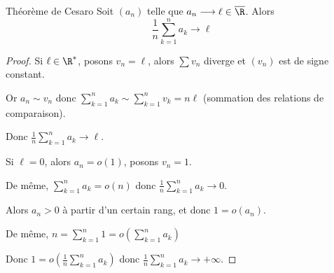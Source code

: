 \begin{proposition}{Théorème de Cesaro}{}
    Soit $(a_n)$ telle que $a_n \longrightarrow \ell \in \overline \R$. Alors 
    $$\frac 1 n \sum_{k = 1}^{n } a_k \longrightarrow \ell$$
    
\end{proposition}


\begin{proof}
    Si $\ell \in \R^*$, posons $v_n = \ell$, alors $\sum v_n$ diverge et $(v_n)$ est de signe constant.

    Or $\displaystyle a_n \sim v_n$ donc $\displaystyle \sum_{k = 1}^{n } a_k \sim \sum_{k = 1}^{n } v_k = n \ell$ (sommation des relations de comparaison). 

    Donc $\displaystyle \frac 1 n \sum_{k = 1}^{n } a_k \longrightarrow \ell$.

    \avspace Si $\ell = 0$, alors $a_n = o(1)$, posons $v_n = 1$.

    De même, $\displaystyle \sum_{k = 1}^{n } a_k = o(n)$ donc $\displaystyle \frac 1 n \sum_{k = 1}^{n } a_k \longrightarrow 0$.


    \svspace Alors $a_n > 0 $ à partir d'un certain rang, et donc $1 = o(a_n)$.

    De même, $\displaystyle n = \sum_{k = 1}^{n } 1 = o\left( \sum_{k = 1}^{n } a_k \right)$ 

    Donc $\displaystyle 1 = o\left( \frac 1 n \sum_{k = 1}^{n } a_k \right)$ donc $\displaystyle \frac 1 n \sum_{k = 1}^{n } a_k \longrightarrow + \infty$.
\end{proof}




